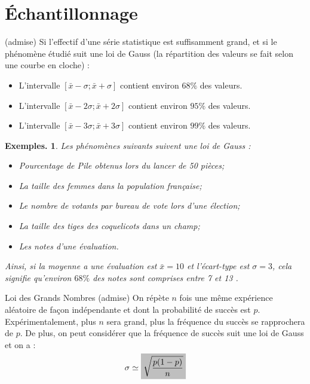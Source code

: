 \documentclass[12pt]{article}
\theoremstyle{break}
\newtheorem*{examples}{Exemples.}
\begin{document}
\section{Échantillonnage}
\begin{proposition}{(admise)}{}
  Si l'effectif d'une série statistique est suffisamment grand, et si le phénomène étudié suit une loi de Gauss (la répartition des valeurs se fait selon une courbe en cloche) :

  \begin{itemize}
    \item L'intervalle $[\bar{x}-\sigma ; \bar{x}+\sigma]$ contient environ $68 \%$ des valeurs.
    \item L'intervalle $[\bar{x}-2 \sigma ; \bar{x}+2 \sigma]$ contient environ $95 \%$ des valeurs.
    \item L'intervalle $[\bar{x}-3 \sigma ; \bar{x}+3 \sigma]$ contient environ $99 \%$ des valeurs.
  \end{itemize}
\end{proposition}

\newpage
\begin{examples}
  Les phénomènes suivants suivent une loi de Gauss :

  \begin{itemize}
    \item Pourcentage de Pile obtenus lors du lancer de 50 pièces;
    \item La taille des femmes dans la population française;
    \item Le nombre de votants par bureau de vote lors d'une élection;
    \item La taille des tiges des coquelicots dans un champ;
    \item Les notes d'une évaluation.
  \end{itemize}

  Ainsi, si la moyenne a une évaluation est $\bar{x}=10$ et l'écart-type est $\sigma=3$, cela signifie qu'environ $68 \%$ des notes sont comprises entre 7 et 13 .
\end{examples}

\begin{proposition}{Loi des Grands Nombres (admise)}{}
On répète $n$ fois une même expérience aléatoire de façon indépendante et dont la probabilité de succès est $p$. Expérimentalement, plus $n$ sera grand, plus la fréquence du succès se rapprochera de $p$. De plus, on peut considérer que la fréquence de succès suit une loi de Gauss et on a :

$$
\sigma \simeq \hideM{\sqrt{\frac{p(1-p)}{n}}}
$$
  
\end{proposition}
\end{document}
